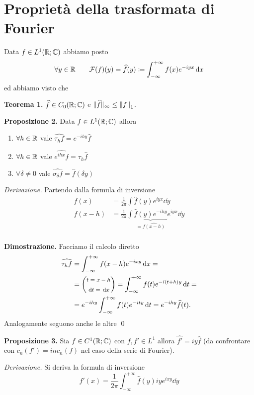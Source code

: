 
\section{Proprietà della trasformata di Fourier}

Data $f \in L^1(\mathbb R; \mathbb C)$ abbiamo posto
$$
\forall y \in \mathbb R
\qquad 
\mathcal F(f)(y) = \widehat f(y) \coloneqq \int_{-\infty}^{+\infty} f(x) e^{-iyx} \,\mathrm{d} x
$$
ed abbiamo visto che

\textbf{Teorema 1.}
$\widehat f \in C_0(\mathbb R; \mathbb C)$ e $\| \widehat f \|_\infty \leq \left\lVert f \right\rVert_1$.

\textbf{Proposizione 2.}
Data $f \in L^1(\mathbb R; \mathbb C)$ allora
\begin{enumerate}
	\item $\forall h \in \mathbb R$ vale $\hat{\tau_h f} = e^{-ihy} \hat f$
	\item $\forall h \in \mathbb R$ vale $\hat{e^{ihx} f} =  \tau_h \hat f$
	\item $\forall \delta \neq 0$ vale $\hat{\sigma_\delta f} = \hat f(\delta y)$
\end{enumerate}

\textit{Derivazione.}
Partendo dalla formula di inversione
$$
\begin{aligned}
	f(x) &= \frac{1}{2\pi} \int \hat f(y) e^{iyx} \dd y \\
	f(x - h) &= \frac{1}{2\pi} \int \underbrace{\hat f(y) e^{-ihy}}_{=\hat{f(x-h)}} e^{iyx} \dd y \\
\end{aligned}
$$

\textbf{Dimostrazione.}
Facciamo il calcolo diretto
$$
\begin{aligned}
	\widehat{\tau_h f}
	&= \int_{-\infty}^{+\infty} f(x - h) e^{-ixy} \,\mathrm{d} x =\\
	&= {\footnotesize \left(\begin{gathered} t = x - h \\ \,\mathrm{d} t = \,\mathrm{d} x \end{gathered}\right)} 
	= \int_{-\infty}^{+\infty} f(t) e^{-i(t + h)y} \,\mathrm{d} t = \\
	&= e^{-ihy} \int_{-\infty}^{+\infty} f(t) e^{-ity} \,\mathrm{d} t = e^{-ihy} \widehat f(t).
\end{aligned}
$$
Analogamente seguono anche le altre
\qed

\textbf{Proposizione 3.}
Sia $f \in C^1(\mathbb R; \mathbb C)$ con $f, f' \in L^1$ allora $\hat{f'} = iy\hat f$ (da confrontare con $c_n(f') = in c_n(f)$ nel caso della serie di Fourier).

\textit{Derivazione.} Si deriva la formula di inversione
$$
f'(x) = \frac{1}{2\pi} \int_{-\infty}^{+\infty} \hat f(y) i y e^{ixy} \dd y
$$


